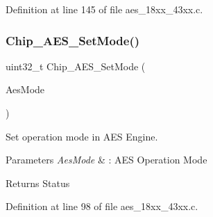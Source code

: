 Definition at line 145 of file aes\+\_\+18xx\+\_\+43xx.\+c.

\mbox{\label{group___a_e_s__18_x_x__43_x_x_gaa78732f8682a60cb228dc9c11bf18484}} 
\subsubsection{\texorpdfstring{Chip\+\_\+\+A\+E\+S\+\_\+\+Set\+Mode()}{Chip\_AES\_SetMode()}}
{\footnotesize\ttfamily uint32\+\_\+t Chip\+\_\+\+A\+E\+S\+\_\+\+Set\+Mode (\begin{DoxyParamCaption}\item[{\hyperlink{group___a_e_s__18_x_x__43_x_x_ga8dd50510d4144a9b12042487fdd42813}{C\+H\+I\+P\+\_\+\+A\+E\+S\+\_\+\+O\+P\+\_\+\+M\+O\+D\+E\+\_\+T}}]{Aes\+Mode }\end{DoxyParamCaption})}



Set operation mode in A\+ES Engine. 


\begin{DoxyParams}{Parameters}
{\em Aes\+Mode} & \+: A\+ES Operation Mode \\
\hline
\end{DoxyParams}
\begin{DoxyReturn}{Returns}
Status 
\end{DoxyReturn}


Definition at line 98 of file aes\+\_\+18xx\+\_\+43xx.\+c.

